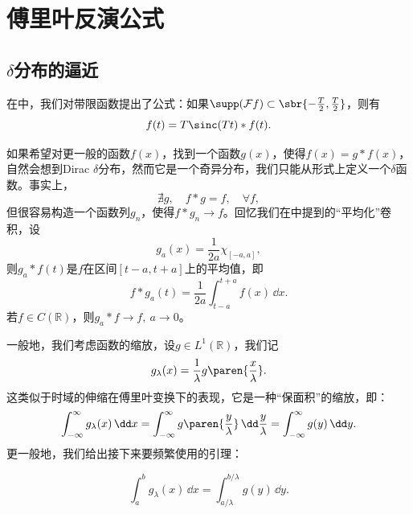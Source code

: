 \section{傅里叶反演公式}\label{sec:Approach}

\subsection{\texorpdfstring{$\delta$分布的逼近}{delta分布的逼近}}\label{sub:approach}
在中，我们对带限函数提出了公式：如果$\supp(\mathcal{F} f)\subset\sbr{-\frac{T}{2},\frac{T}{2}}$，则有
\begin{equation}
    f(t)=T\sinc(Tt)*f(t).
\end{equation}

如果希望对更一般的函数$f(x)$，找到一个函数$g(x)$，使得$f(x)=g*f(x)$，自然会想到Dirac $\delta$分布，然而它是一个奇异分布，我们只能从形式上定义一个$\delta$函数。事实上，
\begin{equation}
    \nexists g,\quad f*g=f,\quad\forall f,
\end{equation}
但很容易构造一个函数列$g_n$，使得$f*g_n\to f$\cite{folland}。回忆我们在中提到的“平均化”卷积，设
\begin{equation}
    g_a(x)=\frac{1}{2a}\chi_{[-a,a]},
\end{equation}
则$g_a*f(t)$是$f$在区间$[t-a,t+a]$上的平均值，即
\begin{equation}
    f*g_a(t)=\frac{1}{2a}\int_{t-a}^{t+a}f(x)\,\dd x.
\end{equation}
若$f\in C(\mathbb{R})$，则$g_a*f\to f,\ a\to 0$。

一般地，我们考虑函数的缩放，设$g\in L^1(\mathbb{R})$，我们记
\begin{equation}
    g_\lambda(x)=\frac{1}{\lambda}g\paren{\frac{x}{\lambda}}.
\end{equation}
这类似于时域的伸缩在傅里叶变换下的表现，它是一种“保面积”的缩放，即：
\begin{equation}
    \int_{-\infty}^{\infty}g_\lambda(x)\,\dd x=\int_{-\infty}^{\infty}g\paren{\frac{y}{\lambda}}\,\dd\frac{y}{\lambda}=\int_{-\infty}^{\infty}g(y)\,\dd y.
\end{equation}
更一般地，我们给出接下来要频繁使用的引理：
\begin{lemma}
    \begin{equation}
        \int_{a}^{b}g_\lambda(x)\,\dd x=\int_{a/\lambda}^{b/\lambda}g(y)\,\dd y.
    \end{equation}
\end{lemma}

